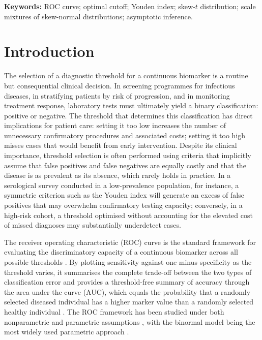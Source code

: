 \documentclass[11pt,a4paper]{article}
\theoremstyle{definition}
\theoremstyle{remark}
\newcommand{\1}{\mathbf{1}}
\begin{document}
\smallskip
\noindent\textbf{Keywords:} ROC curve; optimal cutoff; Youden index;
skew-$t$ distribution; scale mixtures of skew-normal distributions;
asymptotic inference.

\bigskip

\section{Introduction}
\label{sec:introduction}

The selection of a diagnostic threshold for a continuous biomarker is a
routine but consequential clinical decision. In screening programmes for
infectious diseases, in stratifying patients by risk of progression, and
in monitoring treatment response, laboratory tests must ultimately yield
a binary classification: positive or negative. The threshold that
determines this classification has direct implications for patient care:
setting it too low increases the number of unnecessary confirmatory
procedures and associated costs; setting it too high misses cases that
would benefit from early intervention. Despite its clinical importance,
threshold selection is often performed using criteria that implicitly
assume that false positives and false negatives are equally costly and
that the disease is as prevalent as its absence, which rarely holds in
practice. In a serological survey conducted in a low-prevalence
population, for instance, a symmetric criterion such as the Youden index
will generate an excess of false positives that may overwhelm
confirmatory testing capacity; conversely, in a high-risk cohort, a
threshold optimised without accounting for the elevated cost of missed
diagnoses may substantially underdetect cases.

The receiver operating characteristic (ROC) curve is the standard
framework for evaluating the discriminatory capacity of a continuous
biomarker across all possible thresholds
\citep{metz1978basic,pepe2003statistical,zweig1993receiver}. By
plotting sensitivity against one minus specificity as the threshold
varies, it summarises the complete trade-off between the two types of
classification error and provides a threshold-free summary of accuracy
through the area under the curve (AUC), which equals the probability
that a randomly selected diseased individual has a higher marker value
than a randomly selected healthy individual
\citep{bamber1975area,hanley1982meaning}. The ROC framework has been
studied under both nonparametric \citep{delong1988comparing} and
parametric assumptions \citep{metz1978basic,pepe2003statistical}, with
the binormal model being the most widely used parametric approach
\citep{dorfman1969maximum,metz1998proper}.
\end{document}
